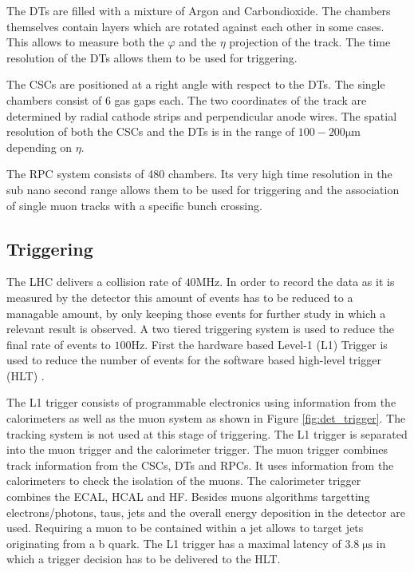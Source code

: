 The DTs are filled with a mixture of Argon and Carbondioxide. The chambers themselves contain layers which are rotated against each other in some cases.
This allows to measure both the $\varphi$ and the $\eta$ projection of the track. The time resolution of the DTs allows them to be used for triggering.

The CSCs are positioned at a right angle with respect to the DTs. The single chambers consist of 6 gas gaps each. The two coordinates of the track are determined by radial cathode strips and perpendicular anode wires.
The spatial resolution of both the CSCs and the DTs is in the range of $100-200 \si{\micro \meter}$ depending on $\eta$.

The RPC system consists of 480 chambers. Its very high time resolution in the sub nano second range allows them to be used for triggering and the association of single muon tracks with a specific bunch crossing.

\subsection{Triggering}

The LHC delivers a collision rate of $40 \si{\mega \hertz}$. In order to record the data as it is measured by the detector this amount of events has to be reduced to a managable amount, by
only keeping those events for further study in which a relevant result is observed. A two tiered triggering system is used to reduce the final rate of events to $100 \si{\hertz}$.
First the hardware based Level-1 (L1) Trigger is used to reduce the number of events for the software based high-level trigger (HLT) \cite{Bayatyan:706847,Tapper:2013yva}.

The L1 trigger consists of programmable electronics using information from the calorimeters as well as the muon system as shown in Figure \ref{fig:det_trigger}. The tracking system is not used at this stage of triggering.
The L1 trigger is separated into the muon trigger and the calorimeter trigger. The muon trigger combines track information from the CSCs, DTs and RPCs. It uses information from the calorimeters to check the isolation of the muons.
The calorimeter trigger combines the ECAL, HCAL and HF. Besides muons algorithms targetting electrons/photons, taus, jets and the overall energy deposition in the detector are used. Requiring a muon to be contained within a jet allows to target jets originating from a b quark.
The L1 trigger has a maximal latency of $3.8 \; \si{\micro \second}$ in which a trigger decision has to be delivered to the HLT.

